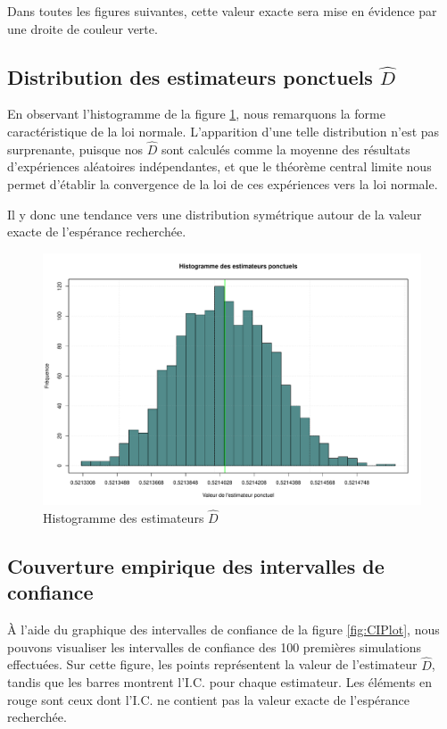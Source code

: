 \documentclass[paper=a4, fontsize=11pt]{scrartcl}
\begin{document}
Dans toutes les figures suivantes, cette valeur exacte sera mise en évidence par une droite de couleur verte.

\subsection{Distribution des estimateurs ponctuels $\widehat{D}$}

En observant l'histogramme de la figure \ref{fig:hist}, nous remarquons la forme caractéristique de la loi normale. L'apparition d'une telle distribution n'est pas surprenante, puisque nos $\widehat{D}$ sont calculés comme la moyenne des résultats d'expériences aléatoires indépendantes, et que le théorème central limite nous permet d'établir la convergence de la loi de ces expériences vers la loi normale.

Il y donc une tendance vers une distribution symétrique autour de la valeur exacte de l'espérance recherchée.

\begin{figure}[h!]
  \centering
  \includegraphics[scale=0.5]{../analysis/plots/EstimatorHistogram.pdf}
  \caption{Histogramme des estimateurs $\widehat{D}$}
  \label{fig:hist}
\end{figure}

\subsection{Couverture empirique des intervalles de confiance}

À l'aide du graphique des intervalles de confiance de la figure \ref{fig:CIPlot}, nous pouvons visualiser les intervalles de confiance des 100 premières simulations effectuées. Sur cette figure, les points représentent la valeur de l'estimateur $\widehat{D}$, tandis que les barres montrent l'I.C. pour chaque estimateur. Les éléments en rouge sont ceux dont l'I.C. ne contient pas la valeur exacte de l'espérance recherchée.
\end{document}
